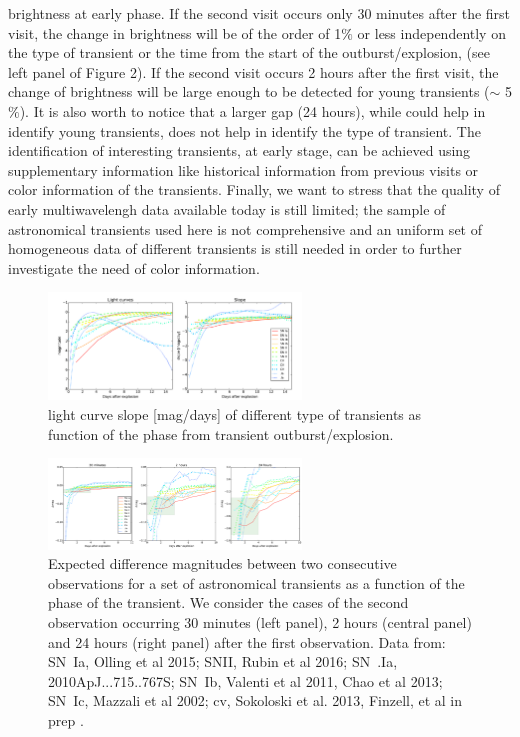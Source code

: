 brightness at early phase. If the second visit occurs only 30 minutes
after the first visit, the change in brightness will be of the order of
1$\%$ or less independently on the type of transient or the time from
the start of the outburst/explosion, (see left panel of Figure 2). If
the second visit occurs 2 hours after the first visit, the change of
brightness will be large enough to be detected for young transients
($\sim$ 5$\%$). It is also worth to notice that a larger gap (24 hours),
while could help in identify young transients, does not help in identify
the type of transient.  The identification of interesting transients, at
early stage, can be achieved using supplementary information like
historical information from previous visits or color information of the
transients. Finally, we want to stress that the quality of early
multiwavelengh data available today is still limited; the sample of
astronomical transients used here is not comprehensive and an uniform
set of homogeneous data of different transients is still needed in order
to further investigate the need of color information.

\begin{figure}[hbt]
\centerline{
\includegraphics[width=0.6\textwidth]{figs/transients/earlyslope.pdf}
}
\caption{light curve slope [mag/days] of different type of transients as
function of the phase from transient outburst/explosion.}
\label{fig:earlyslope}
\end{figure}

\begin{figure}[hbt]
\centerline{
\includegraphics[width=0.6\textwidth]{figs/transients/earlyrise.pdf}
}
\caption{Expected difference magnitudes between two consecutive
observations for a set of astronomical transients as a function of the
phase of the transient. We consider the cases of the second observation
occurring 30 minutes (left panel), 2 hours (central panel) and 24 hours
(right panel) after the first observation. Data from: SN~Ia,  Olling et
al 2015; SNII, Rubin et al 2016; SN~.Ia, 2010ApJ...715..767S; SN~Ib,
Valenti et al 2011, Chao et al 2013; SN~Ic, Mazzali et al 2002; cv,
Sokoloski et al. 2013, Finzell, et al in prep .
}
\label{fig:earlyrise}
\end{figure}
%
